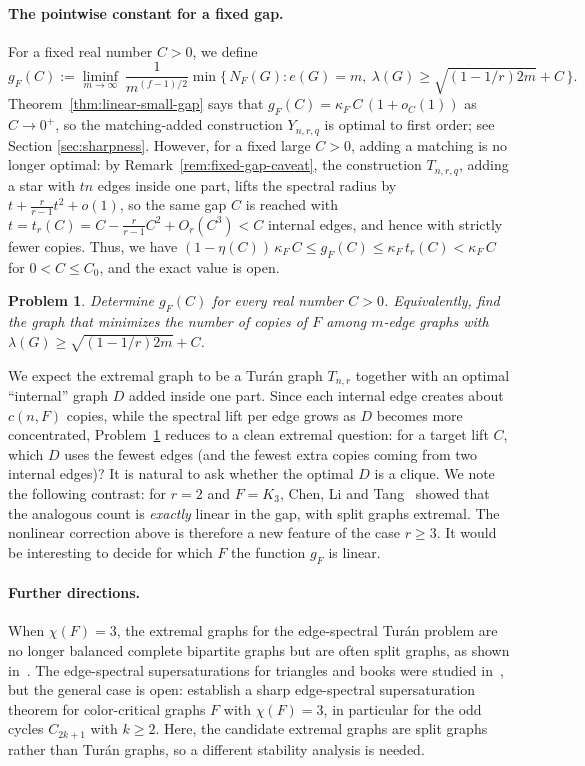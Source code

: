 \documentclass[11pt,a4paper]{article}
\newtheorem{problem}[theorem]{Problem}
\theoremstyle{definition}
\theoremstyle{plain}
\renewcommand{\le}{\leqslant}
\renewcommand{\ge}{\geqslant}
\begin{document}
\paragraph{The pointwise constant for a fixed gap.}
For a fixed real number $C>0$, we define 
\[
  g_F(C):=\liminf_{m\to\infty}\ \frac{1}{m^{(f-1)/2}}
  \min\bigl\{\,N_F(G): e(G)=m,\ \lambda(G)\ge \sqrt{(1\!-\!1/r)2m}+C\,\bigr\}.
\]
Theorem~\ref{thm:linear-small-gap} says that $g_F(C)=\kappa_F\,C\,(1+o_C(1))$ as
$C\to 0^+$, so the matching-added construction $Y_{n,r,q}$ is optimal to first order; see Section \ref{sec:sharpness}. 
However, for a fixed large $C>0$,
 adding a matching is no longer optimal: by Remark~\ref{rem:fixed-gap-caveat}, the construction $T_{n,r,q}$, 
adding a star with $t n$ edges inside one part,  lifts the spectral radius by
$t+\frac{r}{r-1}t^2+o(1)$, so the same gap $C$ is reached with
$t=t_r(C)=C-\frac{r}{r-1}C^2+O_r(C^3)<C$ internal edges, and hence with strictly
fewer copies. Thus, we have 
$ (1-\eta(C))\,\kappa_F\,C \le g_F(C) \le\kappa_F\,t_r(C) < \kappa_F\,C$ for $0<C\le C_0$, 
and the exact value is open.

\begin{problem}\label{prob:pointwise}
Determine $g_F(C)$ for every real number $C>0$. Equivalently, find the graph that minimizes the
number of copies of $F$ among $m$-edge graphs with $\lambda(G)\ge \sqrt{(1\!-\!1/r)2m}+C$.
\end{problem}

We expect the extremal graph to be a Tur\'an graph $T_{n,r}$ together with
an optimal ``internal'' graph $D$ added inside one part. Since each internal edge
creates about $c(n,F)$ copies, while the spectral lift per edge grows as $D$ becomes
more concentrated, Problem~\ref{prob:pointwise} reduces to a clean extremal question:
for a target lift $C$, which $D$ uses the fewest edges (and the fewest extra copies
coming from two internal edges)? It is natural to ask whether the optimal $D$ is a
clique. We note the following contrast: for $r=2$ and $F=K_3$, Chen, Li and Tang~\cite{CLT2026} showed that the analogous count is \emph{exactly} linear in the
gap, with split graphs extremal. The nonlinear correction above is therefore a new
feature of the case $r\ge 3$. It would be interesting to decide for which $F$ the
function $g_F$ is linear.



\paragraph{Further directions.} 
 When $\chi(F)=3$, the extremal graphs for
the edge-spectral Tur\'an problem are no longer balanced complete bipartite graphs but
are often split graphs, as shown in~\cite{ZLS2021,LZS2024, LZZ2024, LLLY2026}.
The edge-spectral supersaturations for triangles and books were studied in~\cite{NZ2021, ZLL2026, ZZ2026, CLT2026}, but the general case is open: 
establish a sharp edge-spectral supersaturation theorem for color-critical graphs $F$
with $\chi(F)=3$, in particular for the odd cycles $C_{2k+1}$ with $k\ge 2$. Here, the
candidate extremal graphs are split graphs rather than Tur\'an graphs, so a different
stability analysis is needed.
\end{document}
